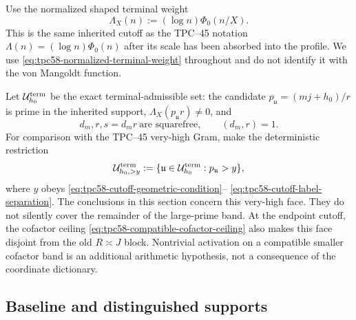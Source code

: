 Use the normalized shaped terminal weight
\begin{equation}
 \Lambda_X(n):=(\log n)\Phi_0(n/X).
 \label{eq:tpc58-normalized-terminal-weight}
\end{equation}
This is the same inherited cutoff as the TPC--45 notation
\(\Lambda(n)=(\log n)\Phi_0(n)\) after its scale has been absorbed into
the profile.  We use \eqref{eq:tpc58-normalized-terminal-weight} throughout
and do not identify it with the von Mangoldt function.

Let \(\mathcal U_{h_0}^{\rm term}\) be the exact terminal-admissible set: the
candidate \(p_{\mathfrak u}=(mj+h_0)/r\) is prime in the inherited support,
\(\Lambda_X(p_{\mathfrak u}r)\ne0\), and
\begin{equation}
 d_m,r,s=d_mr\ \text{are squarefree},
 \qquad(d_m,r)=1.
 \label{eq:tpc58-squarefree-terminal-support}
\end{equation}
For comparison with the TPC--45 very-high Gram, make the deterministic
restriction
\begin{equation}
 \mathcal U_{h_0,>y}^{\rm term}
 :=\{\mathfrak u\in\mathcal U_{h_0}^{\rm term}:p_{\mathfrak u}>y\},
 \label{eq:tpc58-very-high-terminal-set}
\end{equation}
where \(y\) obeys
\eqref{eq:tpc58-cutoff-geometric-condition}--
\eqref{eq:tpc58-cutoff-label-separation}.  The conclusions in this section
concern this very-high face.  They do not silently cover the remainder of
the large-prime band.  At the endpoint cutoff, the cofactor ceiling
\eqref{eq:tpc58-compatible-cofactor-ceiling} also makes this face disjoint
from the old \(R\asymp J\) block.  Nontrivial activation on a compatible
smaller cofactor band is an additional arithmetic hypothesis, not a
consequence of the coordinate dictionary.

\subsection{Baseline and distinguished supports}

